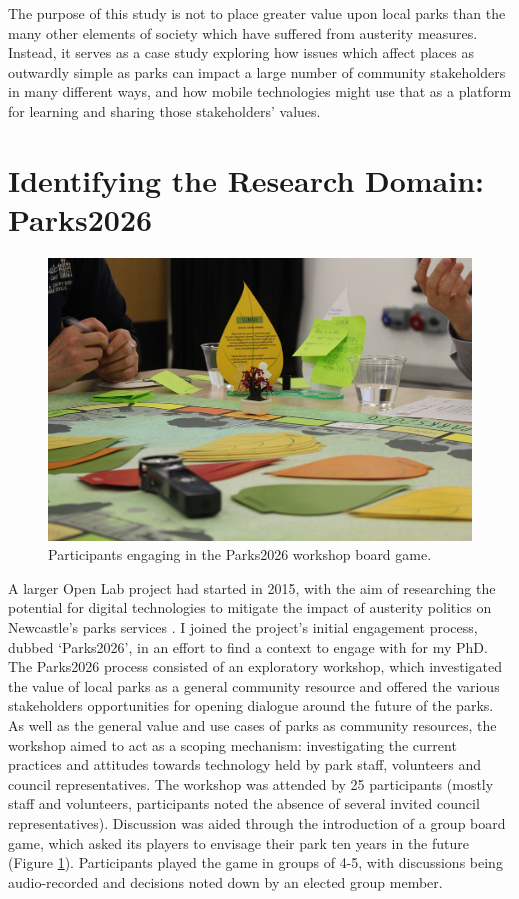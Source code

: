 The purpose of this study is not to place greater value upon local parks than the many other elements of society which have suffered from austerity measures. Instead, it serves as a case study exploring how issues which affect places as outwardly simple as parks can impact a large number of community stakeholders in many different ways, and how mobile technologies might use that as a platform for learning and sharing those stakeholders' values.

\section{Identifying the Research Domain: Parks2026}
\label{sec:Parks2026}

\begin{figure}
  \centering
  \includegraphics[width=0.8\columnwidth]{images/chapter04/parks2026.jpg}
  \caption{Participants engaging in the Parks2026 workshop board game.}
  \label{fig:parks2026}
\end{figure}

A larger Open Lab project had started in 2015, with the aim of researching the potential for digital technologies to mitigate the impact of austerity politics on Newcastle's parks services \citep{Crivellaro2019}. I joined the project's initial engagement process, dubbed `Parks2026', in an effort to find a context to engage with for my PhD. The Parks2026 process consisted of an exploratory workshop, which investigated the value of local parks as a general community resource and offered the various stakeholders opportunities for opening dialogue around the future of the parks. As well as the general value and use cases of parks as community resources, the workshop aimed to act as a scoping mechanism: investigating the current practices and attitudes towards technology held by park staff, volunteers and council representatives. The workshop was attended by 25 participants (mostly staff and volunteers, participants noted the absence of several invited council representatives). Discussion was aided through the introduction of a group board game, which asked its players to envisage their park ten years in the future (Figure \ref{fig:parks2026}). Participants played the game in groups of 4-5, with discussions being audio-recorded and decisions noted down by an elected group member.

